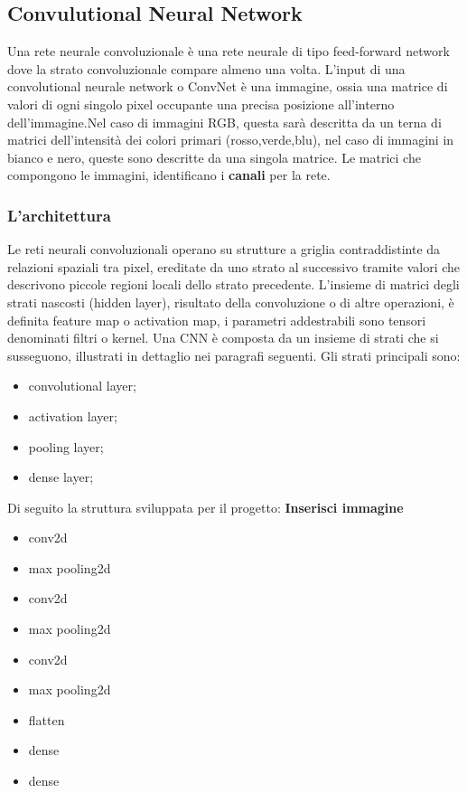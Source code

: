 \documentclass[14pt]{extarticle}
\begin{document}
\subsection{Convulutional Neural Network}
Una rete neurale convoluzionale è una rete neurale di tipo feed-forward network dove la strato convoluzionale compare almeno una volta.
L'input di una convolutional neurale network o ConvNet è una immagine, ossia una matrice di valori di ogni singolo pixel occupante una precisa posizione all'interno dell'immagine.Nel caso di immagini RGB, questa sarà descritta da un terna di matrici dell'intensità dei colori primari (rosso,verde,blu), nel caso di immagini in bianco e nero, queste sono descritte da una singola matrice. Le matrici che compongono le immagini, identificano i \textbf{canali} per la rete. %
\subsubsection{L'architettura} 
Le reti neurali convoluzionali operano su strutture a griglia contraddistinte da relazioni spaziali tra pixel, ereditate da uno strato al successivo tramite valori che descrivono
piccole regioni locali dello strato precedente. L’insieme di matrici degli strati nascosti (hidden layer), risultato della convoluzione o di altre operazioni, è definita feature map o activation map, i parametri addestrabili sono tensori denominati filtri o kernel.
Una CNN è composta da  un insieme di strati che si susseguono, illustrati in dettaglio nei paragrafi seguenti. Gli strati principali sono:
\begin{itemize}
\item convolutional layer;
\item activation layer;
\item pooling layer;
\item dense layer;
\end{itemize}
\cite{torresin2019sviluppo}
Di seguito la struttura sviluppata per il progetto:
\textbf{Inserisci immagine}
\begin{itemize}
	\item conv2d
	\item max pooling2d
	\item conv2d
	\item max pooling2d
	\item conv2d
	\item max pooling2d
	\item flatten
	\item dense
	\item dense
\end{itemize}
\end{document}
